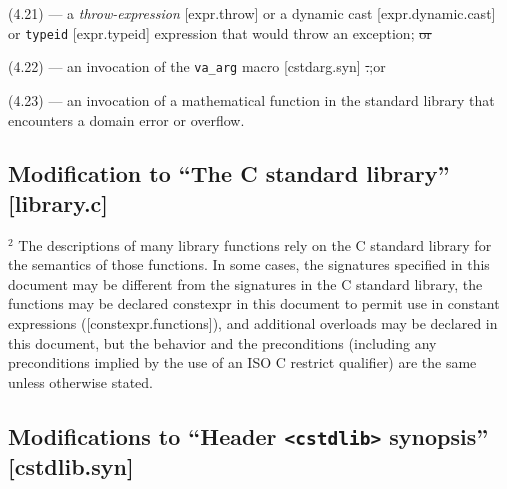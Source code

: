 \documentclass[prd,twocolumn,amsmath,amssymb,nofootinbib,eqsecnum]{revtex4-1}
\newcommand{\code}[1]{{\tt #1}}
\newcommand{\header}[1]{{\tt <#1>}}
\newcommand{\highlight}[1]{{\color{red} #1}}
\begin{document}
{\small (4.21)} --- a \emph{throw-expression} [expr.throw] or a dynamic cast [expr.dynamic.cast] or \code{typeid} [expr.typeid] expression that would throw an exception; \highlight{\st{or}}

{\small (4.22)} --- an invocation of the \code{va\_arg} macro [cstdarg.syn]\highlight{\st{.};or}

\highlight{{{\small (4.23)}} --- an invocation of a mathematical function in the standard library that encounters a domain error or overflow.}

\subsection{Modification to ``The C standard library'' [library.c]}

\hspace{-2.5ex} $^2$ The descriptions of many library functions rely on the C standard library for the semantics of those functions.
In some cases, the signatures specified in this document may be different from the signatures in the C
standard library, 
\highlight{the functions may be declared constexpr in this document to permit use in constant expressions ([constexpr.functions]),}
and additional overloads may be declared in this document, but the behavior and the
preconditions (including any preconditions implied by the use of an ISO C restrict qualifier) are the same
unless otherwise stated.


\subsection{Modifications to ``Header \header{cstdlib} synopsis'' [cstdlib.syn]}
\end{document}
